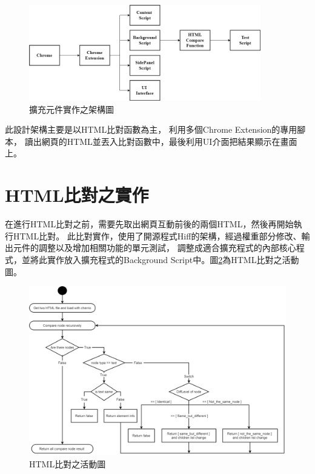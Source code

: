 \begin{figure}[H]
    \centering
    \includegraphics[width=0.9\textwidth]{picture/ch3-systemStucture.png}
    \caption{擴充元件實作之架構圖}
    \label{f3.4}
\end{figure}

此設計架構主要是以HTML比對函數為主，
利用多個Chrome Extension的專用腳本，
讀出網頁的HTML並丟入比對函數中，最後利用UI介面把結果顯示在畫面上。

\section{HTML比對之實作}\label{s3.3}

在進行HTML比對之前，需要先取出網頁互動前後的兩個HTML，然後再開始執行HTML比對\cite{HTML-Comparison-Algorithm}。
此比對實作，使用了開源程式Hiff\cite{Hiff}的架構，經過權重部分修改、輸出元件的調整以及增加相關功能的單元測試，
調整成適合擴充程式的內部核心程式，並將此實作放入擴充程式的Background Script中。圖\ref{f3.5}為HTML比對之活動圖。

\begin{figure}[H]
    \centering
    \includegraphics[width=1.0\textwidth]{picture/ch3-activity diagram.png}
    \caption{HTML比對之活動圖}
    \label{f3.5}
\end{figure}

